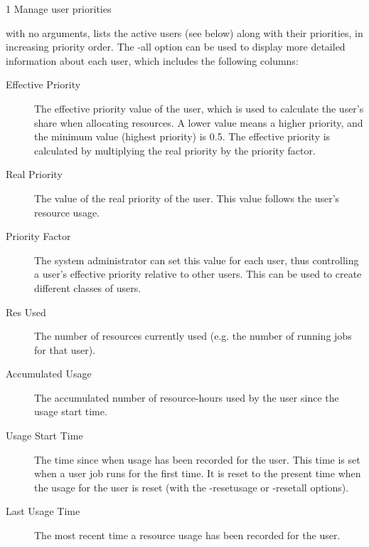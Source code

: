 \begin{ManPage}{\label{man-condor-userprio}}{1}
{Manage user priorities} 
\Synopsis {}


\Description 
{} with no arguments, lists the active users (see below) along with their
priorities, in increasing priority order. The -all option can be used to display
more detailed information about each user, which includes the following columns:

\begin{description}
\item[Effective Priority] The effective priority value of the user, which is used to
calculate the user's share when allocating resources. A lower value means a higher
priority, and the minimum value (highest priority) is 0.5. The effective priority is
calculated by multiplying the real priority by the priority factor.
\item[Real Priority] The value of the real priority of the user. This value follows the
user's resource usage.
\item[Priority Factor] The system administrator can set this value for each user, thus 
controlling a user's effective priority relative to other users. This can be used to
create different classes of users.
\item[Res Used] The number of resources currently used (e.g. the number of running jobs
for that user).
\item[Accumulated Usage] The accumulated number of resource-hours used by the user since
the usage start time.
\item[Usage Start Time] The time since when usage has been recorded for the user. This time
is set when a user job runs for the first time. It is reset to the present time when the
usage for the user is reset (with the -resetusage or -resetall options).
\item[Last Usage Time] The most recent time a resource usage has been recorded for the user.
\end{description}


\end{ManPage}
